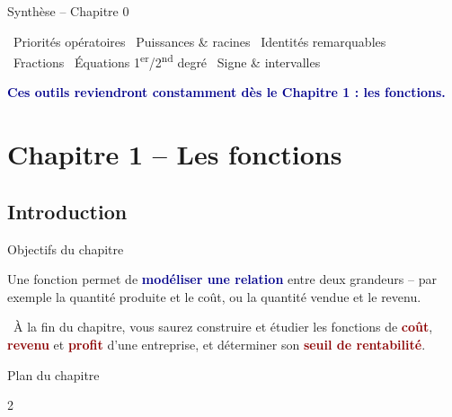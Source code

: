 \documentclass[aspectratio=169,11pt]{beamer}
\newcommand{\important}[1]{\textcolor{DarkRed}{\textbf{#1}}}
\newcommand{\key}[1]{\textcolor{DarkBlue}{\textbf{#1}}}
\begin{document}
\begin{frame}{Synthèse -- Chapitre 0}
	\begin{applicationbox}
		\faCheckCircle\ Priorités opératoires \quad
		\faCheckCircle\ Puissances \& racines \quad
		\faCheckCircle\ Identités remarquables \\[4pt]
		\faCheckCircle\ Fractions \quad
		\faCheckCircle\ Équations 1\textsuperscript{er}/2\textsuperscript{nd} degré \quad
		\faCheckCircle\ Signe \& intervalles
	\end{applicationbox}
	
	\vspace{0.4cm}
	\begin{definitionbox}
		\centering
		\key{Ces outils reviendront constamment dès le Chapitre 1 : les fonctions.}
	\end{definitionbox}
\end{frame}

\section{Chapitre 1 -- Les fonctions}
\subsection{Introduction}

\begin{frame}{Objectifs du chapitre}
	\begin{definitionbox}
		Une fonction permet de \key{modéliser une relation} entre deux grandeurs -- par exemple
		la quantité produite et le coût, ou la quantité vendue et le revenu.
	\end{definitionbox}
	
	\vspace{0.3cm}
	\begin{applicationbox}
		\faBullseye\ À la fin du chapitre, vous saurez construire et étudier les fonctions de
		\important{coût}, \important{revenu} et \important{profit} d'une entreprise, et déterminer
		son \important{seuil de rentabilité}.
	\end{applicationbox}
\end{frame}

\begin{frame}{Plan du chapitre}
	\small
	\begin{multicols}{2}
		\tableofcontents
	\end{multicols}
\end{frame}
\end{document}
